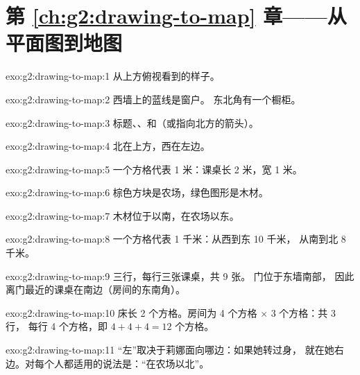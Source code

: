 \section*{第 \ref{ch:g2:drawing-to-map} 章——从平面图到地图}

\begin{solution}{exo:g2:drawing-to-map:1}
从上方俯视看到的样子。
\end{solution}

\begin{solution}{exo:g2:drawing-to-map:2}
西墙上的蓝线是窗户。
东北角有一个橱柜。
\end{solution}

\begin{solution}{exo:g2:drawing-to-map:3}
标题、、和（或指向北方的箭头）。
\end{solution}

\begin{solution}{exo:g2:drawing-to-map:4}
北在上方，西在左边。
\end{solution}

\begin{solution}{exo:g2:drawing-to-map:5}
一个方格代表 1 米：课桌长 2 米，宽 1 米。
\end{solution}

\begin{solution}{exo:g2:drawing-to-map:6}
棕色方块是农场，绿色图形是木材。
\end{solution}

\begin{solution}{exo:g2:drawing-to-map:7}
木材位于以南，在农场以东。
\end{solution}

\begin{solution}{exo:g2:drawing-to-map:8}
一个方格代表 1 千米：从西到东 10 千米，
从南到北 8 千米。
\end{solution}

\begin{solution}{exo:g2:drawing-to-map:9}
三行，每行三张课桌，共 9 张。
门位于东墙南部，
因此离门最近的课桌在南边（房间的东南角）。
\end{solution}

\begin{solution}{exo:g2:drawing-to-map:10}
床长 2 个方格。房间为 4 个方格 × 3 个方格：共 3 行，
每行 4 个方格，即 $4 + 4 + 4 = 12$ 个方格。
\end{solution}

\begin{solution}{exo:g2:drawing-to-map:11}
“左”取决于莉娜面向哪边：如果她转过身，
就在她右边。对每个人都适用的说法是：“在农场以北”。
\end{solution}
